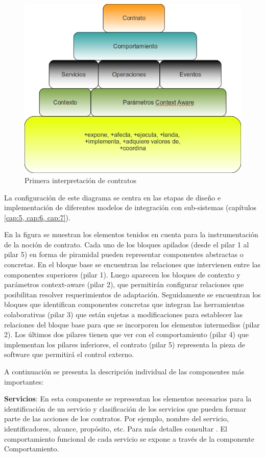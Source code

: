 {\begin{figure}[h]
\begin{center}
 \includegraphics[width=4 in,totalheight=3 in] {Ch0/contratosv1}
\caption{Primera interpretación de contratos} \label{fig:contratosv1}
\end{center}
\end{figure}


La configuración de este diagrama se centra en las etapas de diseño e
implementación de diferentes modelos de integración con sub-sistemas
(capítulos \ref{cap:5, cap:6, cap:7}). 


En la figura se muestran los elementos tenidos en cuenta
para la instrumentación de la noción de contrato. Cada uno de los bloques
apilados (desde el pilar 1 al pilar 5) en forma de piramidal pueden representar
componentes abstractas o concretas. En el bloque base se encuentran las
relaciones que  intervienen entre las componentes superiores (pilar 1). Luego
aparecen los bloques de contexto y parámetros context-aware (pilar 2), que
permitirán configurar relaciones que posibilitan resolver requerimientos de
adaptación. Seguidamente se encuentran los bloques que identifican componentes concretas que
integran las herramientas colaborativas (pilar 3) que están sujetas a
modificaciones para establecer las relaciones del bloque base para que se incorporen los
elementos intermedios (pilar 2). Los últimos dos pilares tienen que ver con el
comportamiento (pilar 4) que implementan los pilares inferiores, el contrato
(pilar 5) representa la pieza de software que permitirá el control externo. 

A continuación se presenta la descripción individual de las componentes más importantes:

\textbf{Servicios}: En esta componente se representan los elementos necesarios
para la identificación de un servicio y clasificación de los servicios que
pueden formar parte de las acciones de los contratos. Por ejemplo, nombre del
servicio, identificadores, alcance, propósito, etc. Para más detalles
consultar \cite{cap1.5}. El comportamiento funcional de cada servicio se
expone a través de la componente Comportamiento.

}
